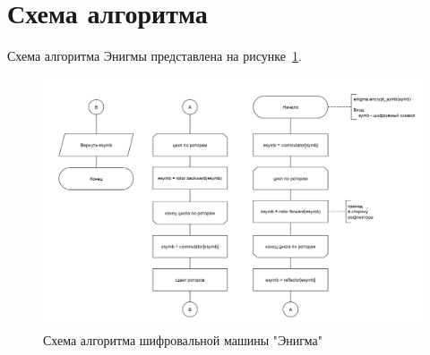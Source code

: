 \section{Схема алгоритма}

Схема алгоритма Энигмы представлена на рисунке~\ref{fig:enigma}.

\begin{figure}[h]
    \centering
    \includegraphics[width=1\linewidth]{images/sheme.png}
    \caption{Схема алгоритма шифровальной машины "Энигма"}
    \label{fig:enigma}
\end{figure}

